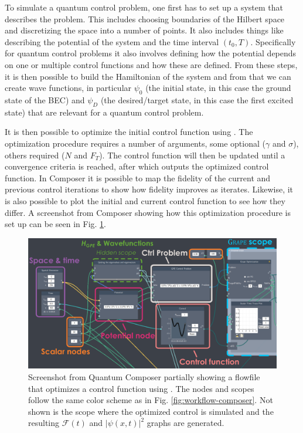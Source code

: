 \documentclass[a4paper, twocolumn]{revtex4-1}
\begin{document}
To simulate a quantum control problem, one first has to set up a system that describes the problem. This includes choosing boundaries of the Hilbert space and discretizing the space into a number of points. It also includes things like describing the potential of the system and the time interval $(t_0, T)$. Specifically for quantum control problems it also involves defining how the potential depends on one or multiple control functions and how these are defined. From these steps, it is then possible to build the Hamiltonian of the system and from that we can create wave functions, in particular $\psi_0$ (the initial state, in this case the ground state of the BEC) and $\psi_D$ (the desired/target state, in this case the first excited state) that are relevant for a quantum control problem.


It is then possible to optimize the initial control function using . The optimization procedure requires a number of arguments, some optional ($\gamma$ and $\sigma$), others required ($N$ and $F_T$). The control function will then be updated until a convergence criteria is reached, after which  outputs the optimized control function. In Composer it is possible to map the fidelity of the current and previous control iterations to show how fidelity improves as  iterates. Likewise, it is also possible to plot the initial and current control function to see how they differ. A screenshot from Composer showing how this optimization procedure is set up can be seen in Fig. \ref{fig:composerScreens}.

\begin{figure}
	\centering
	\includegraphics[width=\textwidth]{graphics/composerScreens/screenshot-v2-highlights.pdf}
	\caption{Screenshot from Quantum Composer partially showing a flowfile that optimizes a control function using . The nodes and scopes follow the same color scheme as in Fig. \ref{fig:workflow-composer}. Not shown is the scope where the optimized control is simulated and the resulting $\mathcal{F}(t)$ and $|\psi(x,t)|^2$ graphs are generated.}
	\label{fig:composerScreens}
\end{figure}
\end{document}
